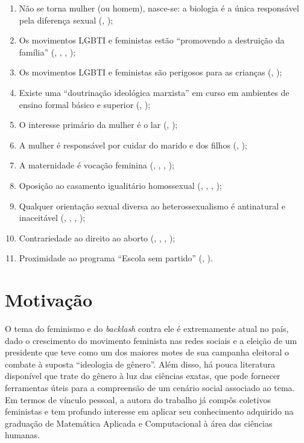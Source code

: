 \documentclass[
	12pt,				%
	openright,			%
	twoside,			%
	a4paper,			%
	english,			%
	brazil				%
	]{abntex2}
\begin{document}
 \begin{enumerate}
  \item Não se torna mulher (ou homem), nasce-se: a biologia é a única responsável pela diferença sexual (, \citeyear{revoredo1998});
  \item Os movimentos LGBTI e feministas estão “promovendo a destruição da família” (, \citeyear{silva2018}, , \citeyear{revoredo1998});
  \item Os movimentos LGBTI e feministas são perigosos para as crianças (, \citeyear{cesar2017});
  \item Existe uma “doutrinação ideológica marxista” em curso em ambientes de ensino formal básico e superior (, \citeyear{silva2018});
  \item O interesse primário da mulher é o lar (, \citeyear{revoredo1998});
  \item A mulher é responsável por cuidar do marido e dos filhos (, \citeyear{silva2018});
  \item A maternidade é vocação feminina (, \citeyear{silva2018}, , \citeyear{revoredo1998});
  \item Oposição ao casamento igualitário homossexual (, \citeyear{silva2018}, , \citeyear{revoredo1998});
  \item Qualquer orientação sexual diversa ao heterossexualismo é antinatural e inaceitável (, \citeyear{silva2018}, , \citeyear{revoredo1998});
  \item Contrariedade ao direito ao aborto (, \citeyear{silva2018}, , \citeyear{revoredo1998});
  \item Proximidade ao programa “Escola sem partido” (, \citeyear{cesar2017}).
\end{enumerate}
 
 \section{Motivação}
 O tema do feminismo e do \textit{backlash} contra ele é extremamente atual no país, dado o crescimento do movimento feminista nas redes sociais e a eleição de um presidente que teve como um dos maiores motes de sua campanha eleitoral o combate à suposta ``ideologia de gênero''. Além disso, há pouca literatura disponível que trate do gênero à luz das ciências exatas, que pode fornecer ferramentas úteis para a compreensão de um cenário social associado ao tema. Em termos de vínculo pessoal, a autora do trabalho já compôs coletivos feministas e tem profundo interesse em aplicar seu conhecimento adquirido na graduação de Matemática Aplicada e Computacional à área das ciências humanas.
 
\end{document}
